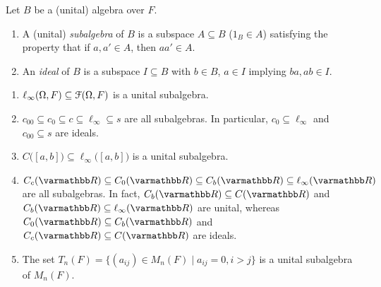     \begin{definition}
        Let $B$ be a (unital) algebra over $F$.
        \begin{enumerate}[label = (\arabic*),itemsep=1pt,topsep=3pt]
            \item A (unital) \textit{subalgebra} of $B$ is a subspace $A \subseteq B$ ($1_B \in A$) satisfying the property that if $a,a' \in A$, then $aa' \in A$.
            \item An \textit{ideal} of $B$ is a subspace $I \subseteq B$ with $b \in B$, $a \in I$ implying $ba,ab \in I$.
        \end{enumerate} 
    \end{definition}

    \begin{example}
        \phantom{a}
        \begin{enumerate}[label = (\arabic*),itemsep=1pt,topsep=3pt]
            \item $\ell_\infty(\Omega,F) \subseteq \mathcal{F}(\Omega,F)$ is a unital subalgebra.
            \item $c_{00} \subseteq c_0 \subseteq c \subseteq \ell_\infty \subseteq s$ are all subalgebras. In particular, $c_0 \subseteq \ell_\infty$ and $c_{00} \subseteq s$ are ideals.
            \item $C\bigl([a,b]\bigr) \subseteq \ell_\infty\bigl([a,b]\bigr)$ is a unital subalgebra.
            \item $C_c(\bfR) \subseteq C_0(\bfR) \subseteq C_b(\bfR) \subseteq \ell_\infty(\bfR)$ are all subalgebras. In fact, $C_b(\bfR) \subseteq C(\bfR)$ and $C_b(\bfR) \subseteq \ell_\infty(\bfR)$ are unital, whereas $C_0(\bfR) \subseteq C_b(\bfR)$ and $C_c(\bfR) \subseteq C(\bfR)$ are ideals.
            \item The set $T_n(F) = \{(a_{ij}) \in M_n(F) \mid a_{ij} = 0, i> j\}$ is a unital subalgebra of $M_n(F)$.
        \end{enumerate}
    \end{example}

